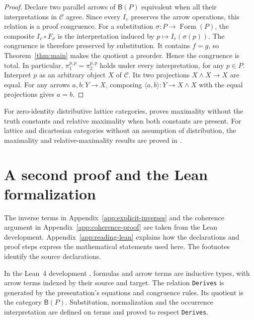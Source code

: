 \documentclass[11pt]{article}
\newcommand{\B}{\mathsf B}
\newcommand{\FormulaSet}{\operatorname{Form}}
\begin{document}
\begin{proof}
Declare two parallel arrows of $\B(P)$ equivalent when all their
interpretations in $\mathcal C$ agree. Since every $I_v$ preserves
the arrow operations, this relation is a proof congruence. For a
substitution $\sigma:P\to\FormulaSet(P)$, the composite
$I_v\circ F_\sigma$ is the interpretation induced by
$p\mapsto I_v(\sigma(p))$. The congruence is therefore preserved
by substitution. It contains $f=g$, so
Theorem~\ref{thm:main} makes the quotient a preorder. Hence the
congruence is total. In particular,
$\pi_1^{p,p}=\pi_2^{p,p}$ holds under every interpretation, for any
$p\in P$. Interpret $p$ as an arbitrary object $X$ of $\mathcal C$.
Its two projections $X\wedge X\to X$ are equal. For any arrows $a,b:Y\to X$, composing
$\langle a,b\rangle:Y\to X\wedge X$ with the equal projections gives $a=b$.
\end{proof}

For zero-identity distributive lattice categories,
\cite[\S12.5, p.~292]{DP} proves maximality without the truth
constants and relative maximality when both constants are present.
For lattice and dicartesian categories without an assumption of
distribution, the maximality and relative-maximality results are
proved in \cite[\S\S8--10]{DPBicartesian}.

\section{A second proof and the Lean formalization}\label{sec:formalization}

The inverse terms in Appendix~\ref{app:explicit-inverses} and the
coherence argument in Appendix~\ref{app:coherence-proof} are taken
from the Lean development. Appendix~\ref{app:reading-lean}
explains how the declarations and proof steps express the mathematical
statements used here. The footnotes identify the source declarations.

In the Lean~4 development \cite{Formalization}, formulas and arrow
terms are inductive types, with arrow terms indexed by their source
and target. The relation \texttt{Derives} is generated by the
presentation's equations and congruence rules. Its quotient is the
category $\B(P)$. Substitution, normalization and the occurrence
interpretation are defined on terms and proved to respect
\texttt{Derives}.
\end{document}
